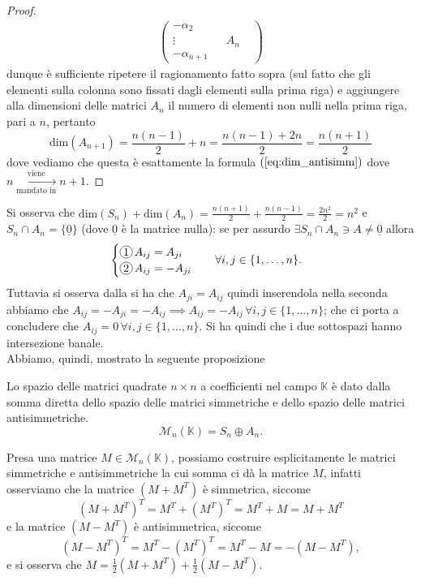 \begin{proof}
\begin{align}
\begin{pmatrix}
    -\alpha_2      &               &        &              \\
    \vdots        &               & A_n    &              \\
    -\alpha_{n+1}  &               &        &
  \end{pmatrix}
\end{align}
dunque è sufficiente ripetere il ragionamento fatto sopra (sul fatto che gli elementi sulla colonna sono fissati dagli elementi sulla prima riga) e aggiungere alla dimensioni delle matrici $A_n$ il numero di elementi non nulli nella prima riga, pari a $n$, pertanto
$$
  \text{dim}(A_{n+1}) = \frac{n(n-1)}{2} + n = \frac{n(n-1) + 2n}{2} = \frac{n(n+1)}{2}
$$
dove vediamo che questa è esattamente la formula $(\ref{eq:dim_antisimm})$ dove $n \underset{\text{mandato in}}{\stackrel{\text{viene}}{\rightarrow}} n+1$.
\end{proof}
Si osserva che $\text{dim}(S_n) + \text{dim}(A_n) = \frac{n(n+1)}{2} + \frac{n(n-1)}{2} = \frac{2n^2}{2} = n^2$ e $S_n \cap A_n = \{ \underline{0} \}$ (dove $\underline{0}$ è la matrice nulla): se per assurdo $\exists S_n \cap A_n \ni A \neq \underline{0}$ allora
\begin{align}
  &\begin{cases}
    \circled{1} \, A_{ij} = A_{ji} \\
    \circled{2} \, A_{ij} = -A_{ji}
  \end{cases} & &\forall i, j \in \{ 1, \ldots, n\}.
\end{align}
Tuttavia si osserva dalla  si ha che $A_{ji} = A_{ij}$ quindi inserendola nella seconda abbiamo che $A_{ij} = -A_{ji} = -A_{ij} \implies A_{ij} = -A_{ij} \, \forall i, j \in \{ 1, \ldots, n \}$; che ci porta a concludere che $A_{ij} = 0 \, \forall i, j \in \{ 1, \ldots, n \}$. Si ha quindi che i due sottospazi hanno intersezione banale. \\
Abbiamo, quindi, mostrato la seguente proposizione
\begin{prop}
  Lo spazio delle matrici quadrate $n \times n$ a coefficienti nel campo $\mathbb{K}$ è dato dalla somma diretta dello spazio delle matrici simmetriche e dello spazio delle matrici antisimmetriche.
  \begin{equation}
    \mathcal{M}_n (\mathbb{K}) = S_n \oplus A_n.
  \end{equation}  
\end{prop}
Presa una matrice $M \in \mathcal{M}_n(\mathbb{K})$, possiamo costruire esplicitamente le matrici simmetriche e antisimmetriche la cui somma ci dà la matrice $M$, infatti osserviamo che la matrice $(M + M^T)$ è simmetrica, siccome
$$
  (M + M^T)^T = M^T + (M^T)^T = M^T + M = M + M^T
$$
e la matrice $(M - M^T)$ è antisimmetrica, siccome
$$
  (M - M^T)^T = M^T - (M^T)^T = M^T - M = -(M - M^T),
$$
e si osserva che $M = \frac{1}{2}(M + M^T) + \frac{1}{2}(M - M^T)$.

